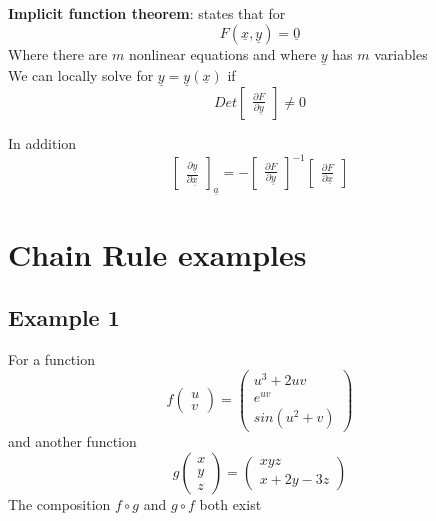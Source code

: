 \begin{framed}
   \textbf{Implicit function theorem}: states that for \[
     F( \underline{x}, \underline{y}) = \underline{0}
  \]
  Where there are $m$ nonlinear equations and where $ \underline{y}$ has $m$ variables \\
   We can locally solve for $ \underline{y} = \underline{y}( \underline{x}) $ if \[
     Det \begin{bmatrix} 
       \frac{\partial F}{\partial \underline{y}} 
     \end{bmatrix}\neq 0
   \] 

   In addition
   \[
      \begin{bmatrix} 
        \frac{\partial \underline{y}}{\partial \underline{x}}  
     \end{bmatrix}_{ \underline{a}} = 
     - \begin{bmatrix} 
       \frac{\partial F}{\partial \underline{y}}  
    \end{bmatrix}^{-1} \begin{bmatrix} 
      \frac{\partial F}{\partial \underline{x}}  
    \end{bmatrix}
   \] 
\end{framed}

\section{Chain Rule examples}

\subsection{Example 1}
For a function \[
  f \begin{pmatrix} u \\v \end{pmatrix} = \begin{pmatrix} 
    u^3 + 2uv \\  
    e^{uv}  \\
    sin(u^2 + v)
  \end{pmatrix}
\] 
and another function \[
  g \begin{pmatrix} x \\ y \\ z \end{pmatrix}  = \begin{pmatrix} 
    xyz \\
    x + 2y - 3z
  \end{pmatrix}
\] 
The composition $ f \circ g$ and $g \circ f$ both exist \\

